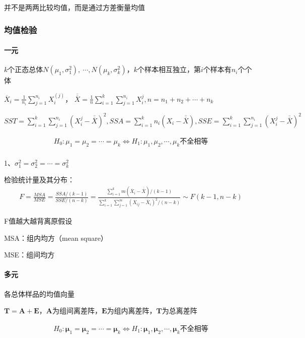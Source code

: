 \documentclass[12pt]{book}
\begin{document}
并不是两两比较均值，而是通过方差衡量均值

\subsubsection{均值检验}

\paragraph{一元}
$k$个正态总体$N\left(\mu_1,\sigma_1^2\right),\ \cdots,N\left(\mu_k,\sigma_k^2\right)$，$k$个样本相互独立，第$i$个样本有$n_i$个个体

${\overline{X}}_i=\frac{1}{n_i}\sum_{j=1}^{n_i}X_i^{(j)}$，
$\overline{\overline{X}}=\frac{1}{n}\sum_{i=1}^{k}\sum_{j=1}^{n_i}{X_i^j},n=n_1+n_2+\cdots+n_k$

$
    SST=\sum_{i=1}^{k}\sum_{j=1}^{n_i}{\left(X_i^j-\overline{\overline{X}}\right)^2}, SSA=\sum_{i=1}^{k}n_i\left(X_i-\overline{\overline{X}}\right) , SSE=\sum_{i=1}^{k}\sum_{j=1}^{n_i}{\left(X_i^j-\overline{\overline{X}}\right)^2}
$

\begin{gather*}
    H_0:\mu_1=\mu_2=\cdots=\mu_k\Leftrightarrow H_1:\mu_1,\mu_2,\cdots,\mu_k\text{不全相等} \\
\end{gather*}


1、$\sigma_1^2=\sigma_2^2=\cdots=\sigma_k^2$

检验统计量及其分布：
\begin{gather*}
    F =\frac{MSA}{MSE} =\frac{SSA/(k-1)}{SSE/(n-k)} =\frac{\sum_{i=1}^{k}{m(\overline{X}_i-\overline{\overline{X}})/(k-1)}}{\sum_{i=1}^{k}\sum_{j=1}^{m}{(X_{ij}-\overline{X}_i)^2/(n-k)}} \sim F(k-1,n-k)
\end{gather*}

\par F值越大越背离原假设
\par MSA：组内均方（mean square）
\par MSE：组间均方

\paragraph{多元}
各总体样品的均值向量

$\mathbf{T}=\mathbf{A}+\mathbf{E}$，$\mathbf{A}$为组间离差阵，$\bm{E}$为组内离差阵，$\bm{T}$为总离差阵

\begin{gather*}
    H_0:\bm{\mu}_1=\bm{\mu}_2=\cdots=\bm{\mu}_k	\Leftrightarrow H_1:\bm{\mu}_1,\bm{\mu}_2,\cdots,\bm{\mu}_k不全相等 \\
\end{gather*}
\end{document}
